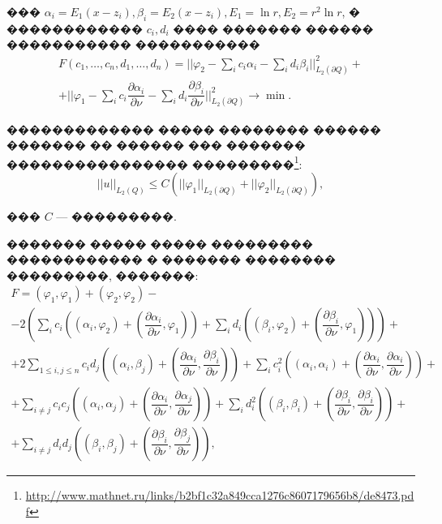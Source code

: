 \documentclass[a4paper]{article}
\begin{document}
��� $\alpha_i=E_1(x-z_i), \beta_i = E_2(x-z_i), E_1=\ln r, E_2= r^2 \ln r$, � ������������ $c_i, d_i$ ���� ������� ������ ����������� �����������
\begin{multline*}
  F(c_1,\dots,c_n,d_1,\dots,d_n)= \biggl|\biggl|\varphi_2 -\sum_i c_i \alpha_i-\sum_i d_i \beta_i   \biggl|\biggl|_{L_2(\partial Q)}^2+\\
  +\biggl|\biggl|\varphi_1 -\sum_i c_i \dfrac{\partial \alpha_i}{\partial \nu} -\sum_i d_i \dfrac{\partial \beta_i }{\partial \nu}   \biggl|\biggl|_{L_2(\partial Q)}^2 \rightarrow \min .
\end{multline*}

������������� ����� �������� ������ ������� �� ������ ��� ������� ���������������� ���������\footnote{\url{http://www.mathnet.ru/links/b2bf1c32a849cca1276c8607179656b8/de8473.pdf}}:
\begin{equation*}
  ||u||_{L_2(Q)} \leq C \left(||\varphi_1||_{L_2(\partial Q)}+ ||\varphi_2||_{L_2(\partial Q)} \right),
\end{equation*}

��� $C$ --- ���������.

������� ����� ����� ��������� ������������ � ������� �������� ���������, �������:
\begin{multline}
  F=(\varphi_1,\varphi_1)+(\varphi_2,\varphi_2) - \\
  -2 \left(\sum_i c_i \left((\alpha_i,\varphi_2)+\left(\dfrac{\partial \alpha_i}{\partial \nu},\varphi_1\right)  \right)+\sum_i d_i \left((\beta_i,\varphi_2)+\left(\dfrac{\partial \beta_i}{\partial \nu},\varphi_1\right)  \right) \right)+\\
  +2\sum_{1 \leq i,j \leq n} c_i d_j \left((\alpha_i,\beta_j)+\left(\dfrac{\partial \alpha_i}{\partial \nu},\dfrac{\partial \beta_i}{\partial \nu}\right)  \right)+
  \sum_i c_i^2 \left(  (\alpha_i,\alpha_i)+\left(\dfrac{\partial \alpha_i}{\partial \nu},\dfrac{\partial \alpha_i}{\partial \nu}\right)  \right)+\\
  +\sum_{i \ne j} c_i c_j \left(  (\alpha_i,\alpha_j)+\left(\dfrac{\partial \alpha_i}{\partial \nu},\dfrac{\partial \alpha_j}{\partial \nu}\right)\right)+
  \sum_i d_i^2 \left(  (\beta_i,\beta_i)+\left(\dfrac{\partial \beta_i}{\partial \nu},\dfrac{\partial \beta_i}{\partial \nu}\right)  \right)+\\
  +\sum_{i \ne j} d_i d_j \left(  (\beta_i,\beta_j)+\left(\dfrac{\partial \beta_i}{\partial \nu},\dfrac{\partial \beta_j}{\partial \nu}\right)\right),
  \label{func}
\end{multline}
\end{document}
